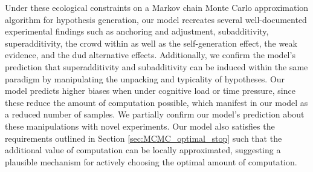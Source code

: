 Under these ecological constraints on a Markov chain Monte Carlo approximation algorithm for hypothesis generation, our model recreates several well-documented experimental findings such as anchoring and adjustment, subadditivity, superadditivity, the crowd within as well as the self-generation effect, the weak evidence, and the dud alternative effects. Additionally, we confirm the model’s prediction that superadditivity and subadditivity can be induced within the same paradigm by manipulating the unpacking and typicality of hypotheses. Our model predicts higher biases when under cognitive load or time pressure, since these reduce the amount of computation possible, which manifest in our model as a reduced number of samples. We partially confirm our model’s prediction about these manipulations with novel experiments. Our model also satisfies the requirements outlined in Section \ref{sec:MCMC_optimal_stop} such that the additional value of computation can be locally approximated, suggesting a plausible mechanism for actively choosing the optimal amount of computation.



%
%



